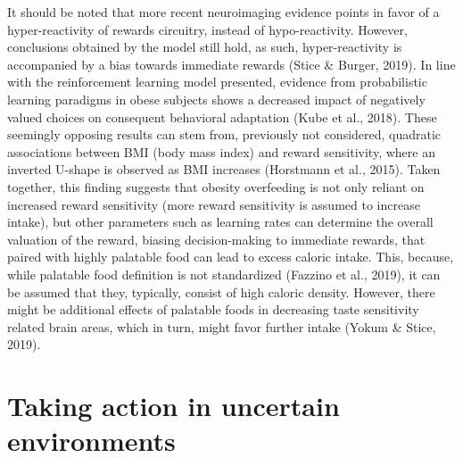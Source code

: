 \documentclass[
]{/home/nicoluarte/Downloads/templates/PNAS-template-main.tex}
\begin{document}
It should be noted that more recent neuroimaging evidence points in
favor of a hyper-reactivity of rewards circuitry, instead of
hypo-reactivity. However, conclusions obtained by the model still hold,
as such, hyper-reactivity is accompanied by a bias towards immediate
rewards (Stice \& Burger, 2019). In line with the reinforcement learning
model presented, evidence from probabilistic learning paradigms in obese
subjects shows a decreased impact of negatively valued choices on
consequent behavioral adaptation (Kube et al., 2018). These seemingly
opposing results can stem from, previously not considered, quadratic
associations between BMI (body mass index) and reward sensitivity, where
an inverted U-shape is observed as BMI increases (Horstmann et al.,
2015). Taken together, this finding suggests that obesity overfeeding is
not only reliant on increased reward sensitivity (more reward
sensitivity is assumed to increase intake), but other parameters such as
learning rates can determine the overall valuation of the reward,
biasing decision-making to immediate rewards, that paired with highly
palatable food can lead to excess caloric intake. This, because, while
palatable food definition is not standardized (Fazzino et al., 2019), it
can be assumed that they, typically, consist of high caloric density.
However, there might be additional effects of palatable foods in
decreasing taste sensitivity related brain areas, which in turn, might
favor further intake (Yokum \& Stice, 2019).

\hypertarget{taking-action-in-uncertain-environments}{%
\section{Taking action in uncertain
environments}\label{taking-action-in-uncertain-environments}}
\end{document}
